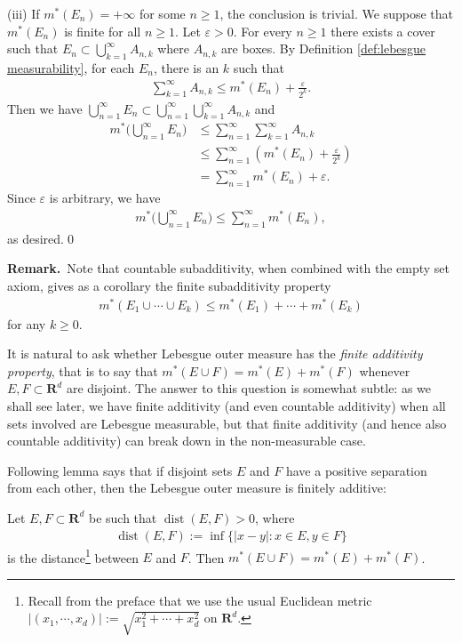 \documentclass{book}
\theoremstyle{defstyle}
\theoremstyle{thmstyle}
\DeclareMathOperator{\dist}{dist}
\newcommand{\remark}{\vspace{.5em}\noindent\textbf{Remark.}~}
\newcommand{\newa}{\vspace{1em}\indent}
\begin{document}
(iii) If $m^*(E_n) = +\infty$ for some $n \geq 1$, the conclusion is trivial. We suppose that $m^*(E_n)$ is finite for all $n \geq 1$. Let $\varepsilon > 0$. For every $n \geq 1$ there exists a cover such that $E_n \subset \bigcup_{k = 1}^{\infty}A_{n, k}$ where $A_{n, k}$ are boxes. By Definition \ref{def:lebesgue measurability}, for each $E_n$, there is an $k$ such that
    \begin{align*}
        \sum_{k = 1}^{\infty}A_{n, k} \leq m^*(E_n) + \frac{\varepsilon}{2^k}.
    \end{align*}
Then we have $\bigcup_{n = 1}^{\infty}E_n \subset \bigcup_{n = 1}^{\infty}\bigcup_{k = 1}^{\infty}A_{n, k}$ and
    \begin{align*}
        m^*\Big(\bigcup_{n = 1}^{\infty}E_n\Big)
        &\leq \sum_{n = 1}^{\infty}\sum_{k = 1}^{\infty}A_{n, k}\\
        &\leq \sum_{n = 1}^{\infty}\left(m^*(E_n) + \frac{\varepsilon}{2^k}\right)\\
        &= \sum_{n = 1}^{\infty}m^*(E_n) + \varepsilon.
    \end{align*}
Since $\varepsilon$ is arbitrary, we have
    \begin{align*}
        m^*\Big(\bigcup_{n = 1}^{\infty}E_n\Big) \leq \sum_{n = 1}^{\infty}m^*(E_n),
    \end{align*}
as desired.\qed

\remark Note that countable subadditivity, when combined with the empty set axiom, gives as a corollary the finite subadditivity property
    \begin{align*}
        m^*(E_1 \cup \cdots \cup E_k) \leq m^*(E_1) + \cdots + m^*(E_k)
    \end{align*}
for any $k \geq 0$.


\newa It is natural to ask whether Lebesgue outer measure has the \emph{finite additivity property}, that is to say that $m^*(E \cup F) = m^*(E) + m^*(F)$ whenever $E, F \subset \mathbf{R}^d$ are disjoint. The answer to this question is somewhat subtle: as we shall see later, we have finite additivity (and even countable additivity) when all sets involved are Lebesgue measurable, but that finite additivity (and hence also countable additivity) can break down in the non-measurable case.

Following lemma says that if disjoint sets $E$ and $F$ have a positive separation from each other, then the Lebesgue outer measure is finitely additive:
\begin{lemma}\label{thm:finite additivity for separated sets}
    Let $E, F \subset \mathbf{R}^d$ be such that $\dist(E, F) > 0$, where
        \begin{align*}
            \dist(E, F) := \inf\{|x - y| : x \in E, y \in F\}
        \end{align*}
    is the distance\footnote{Recall from the preface that we use the usual Euclidean metric $|(x_1, \cdots, x_d)| := \sqrt{x_1^2 + \cdots + x_d^2}$ on $\mathbf{R}^d$.} between $E$ and $F$. Then $m^*(E \cup F) = m^*(E) + m^*(F)$.
\end{lemma}
\end{document}
